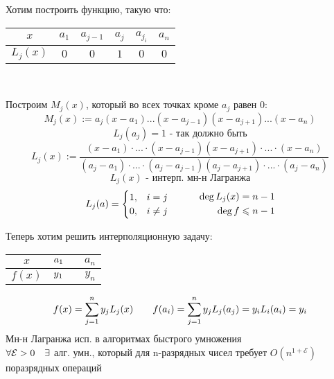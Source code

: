 \documentclass[12pt, fleqn]{article}
\begin{document}
	\begin{definition}
    Хотим построить функцию, такую что:
    \begin{center}
      \begin{tabular} {c | c | c c c | c}
  			$x$    & $a_1$ & $a_{j - 1} $ & $ a_j$ & $a_{j_i}$ & $a_n$ \\
  			\hline
  			$L_j(x)$ & $0$   & $0$          & $1$    & $0$       & $0$
  		\end{tabular}\\
    \end{center}

    Построим $M_j(x)$, который во всех точках кроме $a_j$ равен 0:
		\[M_j(x) := a_j (x - a_1) ... (x - a_{j - 1}) (x - a_{j + 1})...(x - a_n)\]
		\[L_j(a_j) = 1 \text{ - так должно быть}\]
		\[L_j(x) := \frac{(x - a_1) \cdot ... \cdot (x - a_{j - 1})(x - a_{j + 1}) \cdot ... \cdot (x - a_n)}
			{(a_j - a_1) \cdot ... \cdot (a_j - a_{j - 1})(a_j - a_{j + 1}) \cdot ... \cdot (a_j - a_n)}\]
			\[L_j(x) \text{ - интерп. мн-н Лагранжа}\]
			\[L_j(a) =
				\begin{cases}
					1, & i = j    \\
					0, & i \neq j
				\end{cases}
				\quad\quad\quad
				\begin{align}
					\deg L_j(x) = n - 1 \\
					\deg f \leqslant n - 1
				\end{align}
			\]

      Теперь хотим решить интерполяционную задачу:
      \begin{center}
        \begin{tabular} {c | c  c}
  				$x$    & $a_1 \quad$ & $a_n$ \\
  				\hline
  				$f(x)$ & $y_1 \quad$ & $y_n$
  			\end{tabular}
      \end{center}
			\[f(x) = \sum_{j = 1}^n y_j L_j (x) \quad\quad f(a_i) = \sum_{j = 1}^n y_j L_j (a_j) = y_i L_i (a_i) = y_i\]
			Мн-н Лагранжа исп. в алгоритмах быстрого умножения\\
			$\forall \mathcal{E} > 0 \quad \exists $ алг. умн., который для n-разрядных чисел требует $O(n^{1 + \mathcal{E}})$
			поразрядных операций
			\end{definition}
\end{document}

